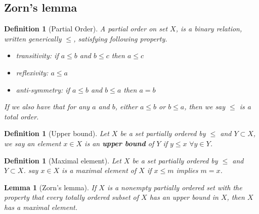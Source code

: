 \documentclass{article}
\newcommand{\nextline}{\hfill\break}
\newtheorem{definition}[example]{Definition}
\newtheorem{lemma}[example]{Lemma}
\begin{document}
\subsection{Zorn's lemma}
\begin{definition}[Partial Order]\rm \nextline
    A partial order on set $X$, is a binary relation, written generically $\leq$, satisfying following property.
    \begin{itemize}
        \item transitivity: if $a\leq b$ and $b\leq c$ then $a\leq c$
        \item reflexivity: $a\leq a$
        \item anti-symmetry: if $a\leq b$ and $b\leq a$ then $a=b$

    \end{itemize}
    If we also have that for any $a$ and $b$, either $a\leq b$ or $b\leq a$, then we say $\leq$ is a total order.

\end{definition}

\begin{definition}[Upper bound]\rm\nextline
    Let $X$ be a set partially ordered by $\leq$ and $Y\subset X$, we say an element $x\in X$ is an {\bf upper bound} of $Y$ if $y\leq x\,\,\forall y\in Y$.

\end{definition}

\begin{definition}[Maximal element]\rm\nextline
    Let $X$ be a set partially ordered by $\leq$ and $Y\subset X$. say $x\in X$ is a maximal element of $X$ if $x\leq m$ implies $m=x$.

\end{definition}
\begin{lemma}[Zorn's lemma]\label{Zorn's Lemma}\rm\nextline
    If $X$ is a nonempty partially ordered set with the
    property that every totally ordered subset of $X$ has an upper bound in $X$, then $X$ has
    a maximal element.
\end{lemma}
\end{document}

